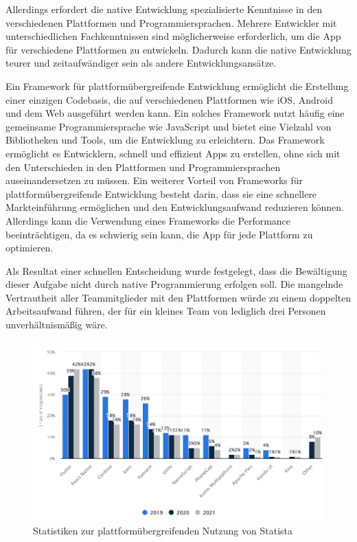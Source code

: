 Allerdings erfordert die native Entwicklung spezialisierte Kenntnisse in den verschiedenen Plattformen und Programmiersprachen. Mehrere Entwickler mit unterschiedlichen Fachkenntnissen sind möglicherweise erforderlich, um die App für verschiedene Plattformen zu entwickeln. Dadurch kann die native Entwicklung teurer und zeitaufwändiger sein als andere Entwicklungsansätze.

Ein Framework für plattformübergreifende Entwicklung ermöglicht die Erstellung einer einzigen Codebasis, die auf verschiedenen Plattformen wie iOS, Android und dem Web ausgeführt werden kann. Ein solches Framework nutzt häufig eine gemeinsame Programmiersprache wie JavaScript und bietet eine Vielzahl von Bibliotheken und Tools, um die Entwicklung zu erleichtern. Das Framework ermöglicht es Entwicklern, schnell und effizient Apps zu erstellen, ohne sich mit den Unterschieden in den Plattformen und Programmiersprachen auseinandersetzen zu müssen. Ein weiterer Vorteil von Frameworks für plattformübergreifende Entwicklung besteht darin, dass sie eine schnellere Markteinführung ermöglichen und den Entwicklungsaufwand reduzieren können. Allerdings kann die Verwendung eines Frameworks die Performance beeinträchtigen, da es schwierig sein kann, die App für jede Plattform zu optimieren.

Als Resultat einer schnellen Entscheidung wurde festgelegt, dass die Bewältigung dieser Aufgabe nicht durch native Programmierung erfolgen soll. Die mangelnde Vertrautheit aller Teammitglieder mit den Plattformen würde zu einem doppelten Arbeitsaufwand führen, der für ein kleines Team von lediglich drei Personen unverhältnismäßig wäre.

\begin{figure}[htbp]
    \centering
    \includegraphics[width=1\textwidth]{pics/cross-platform-statisitics.png}
    \caption{Statistiken zur plattformübergreifenden Nutzung von Statista \cite{statista-software-developer-working-hours} }
    \label{fig:cross-platform-stats}
\end{figure}

